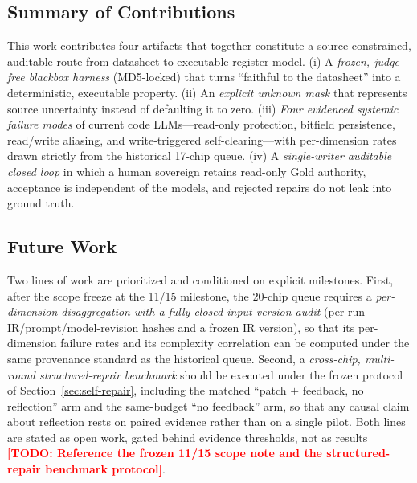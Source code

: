 \documentclass[preprint,review]{elsarticle}
\theoremstyle{definition}
\newcommand{\todo}[1]{\textcolor{red}{\textbf{[TODO: #1]}}}
\begin{document}
\subsection{Summary of Contributions}
This work contributes four artifacts that together constitute a source-constrained, auditable
route from datasheet to executable register model. (i) A \emph{frozen, judge-free blackbox
harness} (MD5-locked) that turns ``faithful to the datasheet'' into a deterministic, executable
property. (ii) An \emph{explicit unknown mask} that represents source uncertainty instead of
defaulting it to zero. (iii) \emph{Four evidenced systemic failure modes} of current code
LLMs---read-only protection, bitfield persistence, read/write aliasing, and write-triggered
self-clearing---with per-dimension rates drawn strictly from the historical 17-chip queue.
(iv) A \emph{single-writer auditable closed loop} in which a human sovereign retains read-only
Gold authority, acceptance is independent of the models, and rejected repairs do not leak into
ground truth.

\subsection{Future Work}
Two lines of work are prioritized and conditioned on explicit milestones. First, after the
scope freeze at the 11/15 milestone, the 20-chip queue requires a \emph{per-dimension
disaggregation with a fully closed input-version audit} (per-run IR/prompt/model-revision
hashes and a frozen IR version), so that its per-dimension failure rates and its complexity
correlation can be computed under the same provenance standard as the historical queue.
Second, a \emph{cross-chip, multi-round structured-repair benchmark} should be executed under
the frozen protocol of Section~\ref{sec:self-repair}, including the matched
``patch $+$ feedback, no reflection'' arm and the same-budget ``no feedback'' arm, so that any
causal claim about reflection rests on paired evidence rather than on a single pilot. Both
lines are stated as open work, gated behind evidence thresholds, not as results
\todo{Reference the frozen 11/15 scope note and the structured-repair benchmark protocol}.



\end{document}
